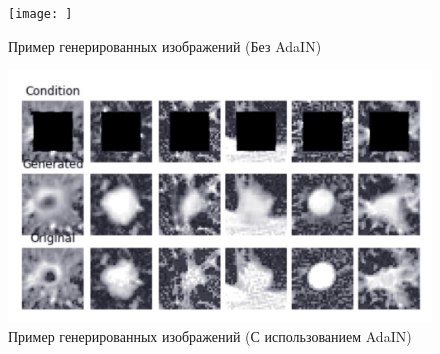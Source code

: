 \begin{figure}[!h]
\texttt{[image: ]}
\caption{Пример генерированных изображений (Без AdaIN)}\label{cgan-baseline-results}
\centering
\end{figure}

\begin{figure}[!h]
\includegraphics[width=\linewidth]{mirskiy-results.jpg}
\caption{Пример генерированных изображений (С использованием AdaIN)}\label{cgan-adain-results}
\centering
\end{figure}
